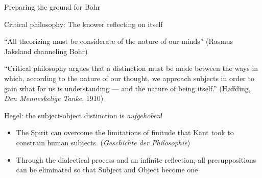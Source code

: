 \documentclass[ignorenonframetext, ]{beamer}
\begin{document}
\begin{frame}{Preparing the ground for Bohr}


\end{frame}


\begin{frame}{Critical philosophy: The knower reflecting on itself}

  ``All theorizing must be considerate of the nature of our minds''
  \newline (Rasmus Jaksland channeling Bohr)

  \vfill ``Critical philosophy argues that a distinction must be made
  between the ways in which, according to the nature of our thought,
  we approach subjects in order to gain what for us is understanding
  --- and the nature of being itself.'' \newline (Høffding, \emph{Den
    Menneskelige Tanke}, 1910)

\end{frame}

\begin{frame}{Hegel: the subject-object distinction is \emph{aufgehoben}!}

  \begin{itemize}
  \item The Spirit can overcome the limitations of finitude that Kant
    took to constrain human subjects. (\emph{Geschichte der
      Philosophie})
  \item Through the dialectical process and an infinite reflection,
    all presuppositions can be eliminated so that Subject and Object
    become one
  \end{itemize}
  
\end{frame}
\end{document}
